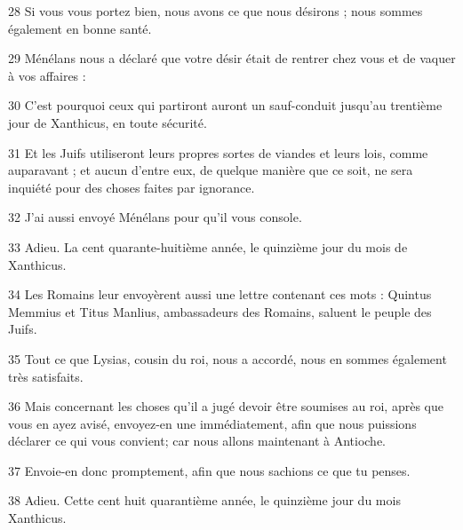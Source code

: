 \par 28 Si vous vous portez bien, nous avons ce que nous désirons ; nous sommes également en bonne santé.
\par 29 Ménélans nous a déclaré que votre désir était de rentrer chez vous et de vaquer à vos affaires :
\par 30 C'est pourquoi ceux qui partiront auront un sauf-conduit jusqu'au trentième jour de Xanthicus, en toute sécurité.
\par 31 Et les Juifs utiliseront leurs propres sortes de viandes et leurs lois, comme auparavant ; et aucun d'entre eux, de quelque manière que ce soit, ne sera inquiété pour des choses faites par ignorance.
\par 32 J'ai aussi envoyé Ménélans pour qu'il vous console.
\par 33 Adieu. La cent quarante-huitième année, le quinzième jour du mois de Xanthicus.
\par 34 Les Romains leur envoyèrent aussi une lettre contenant ces mots : Quintus Memmius et Titus Manlius, ambassadeurs des Romains, saluent le peuple des Juifs.
\par 35 Tout ce que Lysias, cousin du roi, nous a accordé, nous en sommes également très satisfaits.
\par 36 Mais concernant les choses qu'il a jugé devoir être soumises au roi, après que vous en ayez avisé, envoyez-en une immédiatement, afin que nous puissions déclarer ce qui vous convient; car nous allons maintenant à Antioche.
\par 37 Envoie-en donc promptement, afin que nous sachions ce que tu penses.
\par 38 Adieu. Cette cent huit quarantième année, le quinzième jour du mois Xanthicus.


